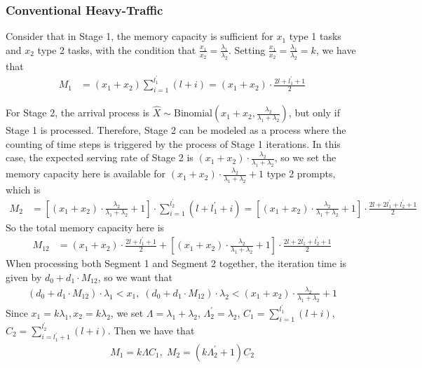 \documentclass[opre, nonblindrev]{informs3} %
\begin{document}
\subsubsection{Conventional Heavy-Traffic} 
Consider that in Stage 1, the memory capacity is sufficient for $x_1$ type 1 tasks and $x_2$ type 2 tasks, with the condition that $\frac{x_1}{x_2} = \frac{\lambda_1}{\lambda_2}$. Setting $\frac{x_1}{x_2} = \frac{\lambda_1}{\lambda_2}=k$, we have that 
\begin{align*}
    M_1 &= (x_1+x_2)\sum_{i=1}^{l_1^{\prime}}(l+i)=(x_1+x_2)\cdot\frac{2l+l^{\prime}_1+1}{2}
\end{align*}

For Stage 2, the arrival process is $\hat{X} \sim \text{Binomial}\left(x_1 + x_2, \frac{\lambda_2}{\lambda_1 + \lambda_2}\right)$, but only if Stage 1 is processed. Therefore, Stage 2 can be modeled as a process where the counting of time steps is triggered by the process of Stage 1 iterations. In this case, the expected serving rate of Stage 2 is $(x_1+x_2)\cdot \frac{\lambda_2}{\lambda_1 + \lambda_2}$, so we set the memory capacity here is available for $(x_1+x_2)\cdot \frac{\lambda_2}{\lambda_1 + \lambda_2}+1$ type 2 prompts, which is 
\begin{align*}
    M_2&=\left[(x_1+x_2)\cdot \frac{\lambda_2}{\lambda_1 + \lambda_2}+1\right]\cdot \sum_{i=1}^{l_2^{\prime}}(l+l_1^{\prime}+i)=\left[(x_1+x_2)\cdot \frac{\lambda_2}{\lambda_1 + \lambda_2}+1\right]\cdot \frac{2l+2l_1^{\prime}+l_2^{\prime}+1 }{2}
\end{align*}
So the total memory capacity here is 
\begin{align*}
    M_{12}&=(x_1+x_2)\cdot\frac{2l+l^{\prime}_1+1}{2}+\left[(x_1+x_2)\cdot \frac{\lambda_2}{\lambda_1 + \lambda_2}+1\right]\cdot \frac{2l+2l_1^{\prime}+l_2^{\prime}+1 }{2}
\end{align*}
When processing both Segment 1 and Segment 2 together, the iteration time is given by $d_0+d_1\cdot M_{12}$, so we want that
\begin{align*}
    \left(d_0+d_1\cdot M_{12}\right)\cdot \lambda_1< x_1,\;\left(d_0+d_1\cdot M_{12}\right)\cdot \lambda_2< (x_1+x_2)\cdot \frac{\lambda_2}{\lambda_1 + \lambda_2}+1
\end{align*}
Since $x_1=k\lambda_1,x_2=k\lambda_2$, we set $\Lambda = \lambda_1+\lambda_2$, $\Lambda_2^{\prime}=\lambda_2$, $C_1=\sum_{i=1}^{l_1^{\prime}}(l+i)$, $C_2=\sum_{i=l_1^{\prime}+1}^{l_2^{\prime}}(l+i)$. Then we have that 
\begin{align*}
    M_1 = k\Lambda C_1, \; M_2 = (k \Lambda_2^{\prime}+1)C_2
\end{align*}
\end{document}
